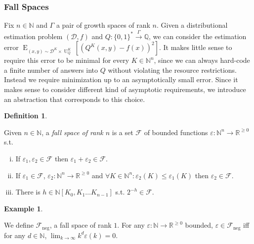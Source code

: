 \documentclass[11pt]{article}
\numberwithin{equation}{section}
\theoremstyle{definition}
\newtheorem{definition}{Definition}[section]
\newtheorem{example}{Example}[section]
\theoremstyle{plain}
\newcommand{\Bool}{\{0,1\}}
\newcommand{\Words}{{\Bool^*}}
\DeclareMathOperator{\E}{E}
\DeclareMathOperator{\Un}{U}
\newcommand{\Nats}{\mathbb{N}}
\newcommand{\Rats}{\mathbb{Q}}
\newcommand{\Reals}{\mathbb{R}}
\newcommand{\NatPoly}{\Nats[K_0, K_1 \ldots K_{n-1}]}
\newcommand{\NatFun}{\Nats^n \rightarrow}
\newcommand{\Lim}[1]{\lim_{#1 \rightarrow \infty}}
\newcommand{\Dist}{\mathcal{D}}
\newcommand{\Fall}{\mathcal{F}}
\newcommand{\Scheme}{\xrightarrow{\Gamma}}
\begin{document}
\subsubsection{Fall Spaces}

Fix $n \in \Nats$ and $\Gamma$ a pair of growth spaces of rank $n$. Given a distributional estimation problem $(\Dist,f)$ and $Q: \Words \Scheme \Rats$, we can consider the estimation error $\E_{(x,y) \sim \Dist^{K} \times \Un_Q^K}[(Q^K(x,y) - f(x))^2]$. It makes little sense to require this error to be minimal for every $K \in \Nats^n$, since we can always hard-code a finite number of answers into $Q$ without violating the resource restrictions. Instead we require minimization up to an asymptotically small error. Since it makes sense to consider different kind of asymptotic requirements, we introduce an abstraction that corresponds to this choice.

\begin{definition}
\label{def:fall}

Given $n \in \Nats$, a \emph{fall space of rank $n$} is a set $\Fall$ of bounded functions $\varepsilon: \NatFun \Reals^{\geq 0}$ s.t.

\begin{enumerate}[(i)]

\item\label{con:def__fall__add} If $\varepsilon_1, \varepsilon_2 \in \Fall$ then $\varepsilon_1 + \varepsilon_2 \in \Fall$.

\item\label{con:def__fall__ineq} If $\varepsilon_1 \in \Fall$, $\varepsilon_2: \NatFun \Reals^{\geq 0}$ and $\forall K \in \Nats^n: \varepsilon_2(K) \leq \varepsilon_1(K)$ then $\varepsilon_2 \in \Fall$.

\item\label{con:def__fall__pol} There is $h \in \NatPoly$ s.t. $2^{-h} \in \Fall$.

\end{enumerate}
\end{definition}

\begin{example}
\label{exm:fall_neg}

We define $\Fall_{\text{neg}}$, a fall space of rank $1$. For any $\varepsilon: \Nats \rightarrow \Reals^{\geq 0}$ bounded, $\varepsilon \in \Fall_{\text{neg}}$ iff for any $d \in \Nats$, $\Lim{k} k^d \varepsilon(k) = 0$.

\end{example}
\end{document}
